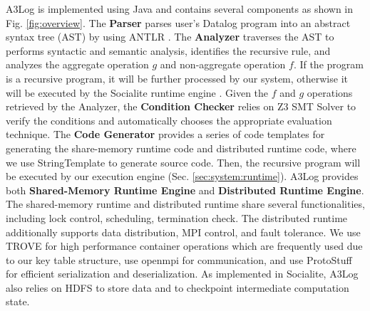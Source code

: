 A3Log is implemented using Java and contains several components as shown in Fig. \ref{fig:overview}. The \textbf{Parser} parses user's Datalog program into an abstract syntax tree (AST) by using ANTLR \cite{antlr}. The \textbf{Analyzer} traverses the AST to performs syntactic and semantic analysis, identifies the recursive rule, and analyzes the aggregate operation $g$ and non-aggregate operation $f$. If the program is a recursive program, it will be further processed by our system, otherwise it will be executed by the Socialite runtime engine \cite{Lam:2013:SDE:2510649.2511289,Seo:2013:DSD:2556549.2556572}. Given the $f$ and $g$ operations retrieved by the Analyzer, the \textbf{Condition Checker} relies on Z3 SMT Solver \cite{DeMoura:2008:ZES:1792734.1792766,z3} to verify the conditions and automatically chooses the appropriate evaluation technique. The \textbf{Code Generator} provides a series of code templates for generating the share-memory runtime code and distributed runtime code, where we use StringTemplate \cite{stringtemplate} to generate source code. Then, the recursive program will be executed by our execution engine (Sec. \ref{sec:system:runtime}). A3Log provides both \textbf{Shared-Memory Runtime Engine} and \textbf{Distributed Runtime Engine}. The shared-memory runtime and distributed runtime share several functionalities, including lock control, scheduling, termination check. The distributed runtime additionally supports data distribution, MPI control, and fault tolerance. We use TROVE \cite{trove} for high performance container operations which are frequently used due to our key table structure, use openmpi \cite{mpich} for  communication, and use ProtoStuff \cite{Protostuff} for efficient serialization and deserialization. As implemented in Socialite, A3Log also relies on HDFS to store data and to checkpoint intermediate computation state.

